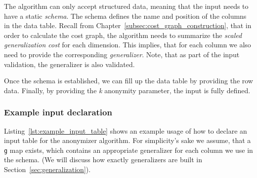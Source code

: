 The algorithm can only accept structured data, meaning that the input needs to have a static \emph{schema}.
The schema defines the name and position of the columns in the data table.
Recall from Chapter~\ref{subsec:cost_graph_construction}, that in order to calculate the cost graph, the algorithm needs to summarize the \textit{scaled generalization cost} for each dimension.
This implies, that for each column we also need to provide the corresponding \emph{generalizer}.
Note, that as part of the input validation, the generalizer is also validated.

Once the schema is established, we can fill up the data table by providing the row data.
Finally, by providing the \textit{k} anonymity parameter, the input is fully defined.


\subsubsection{Example input declaration}

Listing~\ref{lst:example_input_table} shows an example usage of how to declare an input table for the anonymizer algorithm.
For simplicity's sake we assume, that a \texttt{g} map exists, which contains an appropriate generalizer for each column we use in the schema. (We will discuss how exactly generalizers are built in Section~\ref{sec:generalization}).

